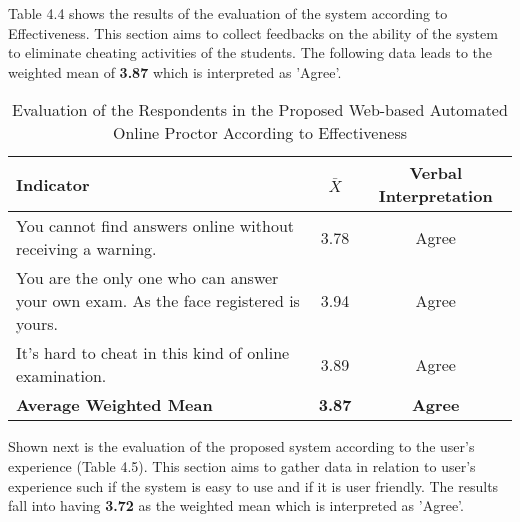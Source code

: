 Table 4.4 shows the results of the evaluation of the system according to Effectiveness.
This section aims to collect feedbacks on the ability of the system to eliminate cheating activities of the students.
The following data leads to the weighted mean of \textbf{3.87} which is interpreted as 'Agree'.

\begin{table}[h!]
   \begin{center}
      \begin{tabular}{|m{20em}|c|c|}
         \hline
         \textbf{Indicator}                                                                  & \textbf{$\bar{X}$} & \textbf{Verbal Interpretation} \\
         \hline
         You cannot find answers online without receiving a warning.                         & 3.78               & Agree                          \\
         \hline
         You are the only one who can answer your own exam. As the face registered is yours. & 3.94               & Agree                          \\
         \hline
         It's hard to cheat in this kind of online examination.                              & 3.89               & Agree                          \\
         \hline
         \textbf{Average Weighted Mean}                                                      & \textbf{3.87}      & \textbf{Agree}                 \\
         \hline
      \end{tabular}
   \end{center}
   \caption{Evaluation of the Respondents in the Proposed Web-based Automated Online Proctor According to Effectiveness}
\end{table}

Shown next is the evaluation of the proposed system according to the user's experience (Table 4.5).
This section aims to gather data in relation to user's experience such if the system is easy to use and if it is user friendly.
The results fall into having \textbf{3.72} as the weighted mean which is interpreted as 'Agree'.

